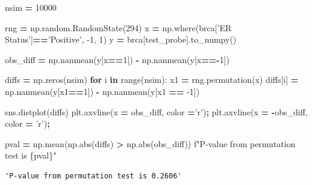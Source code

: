 \documentclass[
  letterpaper,
]{scrbook}
\newenvironment{Shaded}{\begin{snugshade}}{\end{snugshade}}
\newcommand{\BuiltInTok}[1]{#1}
\newcommand{\ControlFlowTok}[1]{\textcolor[rgb]{0.13,0.29,0.53}{\textbf{#1}}}
\newcommand{\DecValTok}[1]{\textcolor[rgb]{0.00,0.00,0.81}{#1}}
\newcommand{\KeywordTok}[1]{\textcolor[rgb]{0.13,0.29,0.53}{\textbf{#1}}}
\newcommand{\NormalTok}[1]{#1}
\newcommand{\OperatorTok}[1]{\textcolor[rgb]{0.81,0.36,0.00}{\textbf{#1}}}
\newcommand{\SpecialCharTok}[1]{\textcolor[rgb]{0.00,0.00,0.00}{#1}}
\newcommand{\SpecialStringTok}[1]{\textcolor[rgb]{0.31,0.60,0.02}{#1}}
\newcommand{\StringTok}[1]{\textcolor[rgb]{0.31,0.60,0.02}{#1}}
\begin{document}
\begin{Shaded}
\begin{Highlighting}[]
\NormalTok{nsim }\OperatorTok{=} \DecValTok{10000}

\NormalTok{rng }\OperatorTok{=}\NormalTok{ np.random.RandomState(}\DecValTok{294}\NormalTok{)}
\NormalTok{x }\OperatorTok{=}\NormalTok{ np.where(brca[}\StringTok{'ER Status'}\NormalTok{]}\OperatorTok{==}\StringTok{'Positive'}\NormalTok{, }\DecValTok{-1}\NormalTok{, }\DecValTok{1}\NormalTok{)}
\NormalTok{y }\OperatorTok{=}\NormalTok{ brca[test_probe].to_numpy()}

\NormalTok{obs_diff }\OperatorTok{=}\NormalTok{ np.nanmean(y[x}\OperatorTok{==}\DecValTok{1}\NormalTok{]) }\OperatorTok{-}\NormalTok{ np.nanmean(y[x}\OperatorTok{==-}\DecValTok{1}\NormalTok{])}

\NormalTok{diffs }\OperatorTok{=}\NormalTok{ np.zeros(nsim)}
\ControlFlowTok{for}\NormalTok{ i }\KeywordTok{in} \BuiltInTok{range}\NormalTok{(nsim):}
\NormalTok{    x1 }\OperatorTok{=}\NormalTok{ rng.permutation(x)}
\NormalTok{    diffs[i] }\OperatorTok{=}\NormalTok{ np.nanmean(y[x1}\OperatorTok{==}\DecValTok{1}\NormalTok{]) }\OperatorTok{-}\NormalTok{ np.nanmean(y[x1 }\OperatorTok{==} \DecValTok{-1}\NormalTok{])}
\end{Highlighting}
\end{Shaded}

\begin{Shaded}
\begin{Highlighting}[]
\NormalTok{sns.distplot(diffs)}
\NormalTok{plt.axvline(x }\OperatorTok{=}\NormalTok{ obs_diff, color }\OperatorTok{=}\StringTok{'r'}\NormalTok{)}\OperatorTok{;}
\NormalTok{plt.axvline(x }\OperatorTok{=} \OperatorTok{-}\NormalTok{obs_diff, color }\OperatorTok{=} \StringTok{'r'}\NormalTok{)}\OperatorTok{;}
\end{Highlighting}
\end{Shaded}

\begin{Shaded}
\begin{Highlighting}[]
\NormalTok{pval }\OperatorTok{=}\NormalTok{ np.mean(np.}\BuiltInTok{abs}\NormalTok{(diffs) }\OperatorTok{>}\NormalTok{ np.}\BuiltInTok{abs}\NormalTok{(obs_diff))}
\SpecialStringTok{f"P-value from permutation test is }\SpecialCharTok{\{}\NormalTok{pval}\SpecialCharTok{\}}\SpecialStringTok{"}
\end{Highlighting}
\end{Shaded}

\begin{verbatim}
'P-value from permutation test is 0.2606'
\end{verbatim}
\end{document}

